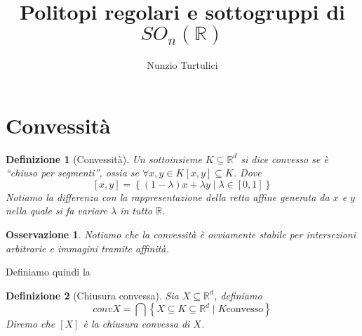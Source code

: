 \documentclass[a4paper,12pt,italian]{article}
\author{Nunzio Turtulici}
\title{Politopi regolari e sottogruppi di $SO_n(\mathbb{R})$}
\newcommand{\Rd}{\mathbb{R}^d}
\newtheorem{defin}{Definizione}
\newtheorem{oss}{Osservazione}
\begin{document}
\section{Convessit\`a}

\begin{defin}[Convessit\`a]
Un sottoinsieme $K\subseteq \Rd$ si dice \emph{convesso} se \`e ``chiuso per segmenti'', ossia se
$\forall x,y\in K \left[x,y\right]\subseteq K$. Dove
\begin{equation}
\left[x,y\right]=\left\{(1-\lambda)x + \lambda y\mid\lambda\in\left[0,1\right]\right\}
\end{equation}
Notiamo la differenza con la rappresentazione della retta affine generata da $x$ e $y$ nella quale si fa variare $\lambda$
in tutto $\mathbb{R}$.
\end{defin}
\begin{oss}	%
Notiamo che la convessit\`a \`e ovviamente stabile per intersezioni arbitrarie e immagini tramite affinit\`a.
\end{oss}
Definiamo quindi la
\begin{defin}[Chiusura convessa]
Sia $X\subseteq\Rd$, definiamo
\begin{equation}
convX=\bigcap\left\{X\subseteq K\subseteq\Rd\mid K\text{convesso}\right\}
\end{equation}
Diremo che $\left[X\right]$ \`e la chiusura convessa di $X$.
\end{defin}
\end{document}
